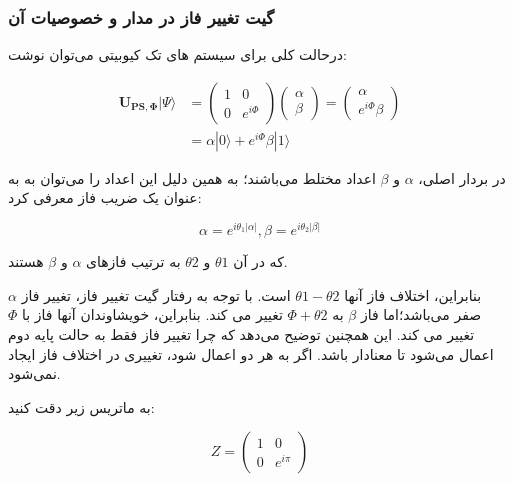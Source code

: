 \documentclass{book}
\begin{document}
\subsubsection{گیت تغییر فاز در مدار و خصوصیات آن}
درحالت کلی برای سیستم های تک کیوبیتی می‌توان نوشت:

\begin{center}
	$$\begin{aligned}
		\boldsymbol{U}_{\boldsymbol{P S}, \boldsymbol{\Phi}}|\Psi\rangle & =\left(\begin{array}{cc}
			1 & 0 \\
			0 & e^{i \Phi}
		\end{array}\right)\left(\begin{array}{l}
			\alpha \\
			\beta
		\end{array}\right)=\left(\begin{array}{c}
			\alpha \\
			e^{i \Phi} \beta
		\end{array}\right) \\
		& =\alpha|0\rangle+e^{i \Phi} \beta|1\rangle
	\end{aligned}$$
\end{center}
در بردار اصلی، $\alpha$ و $\beta$ اعداد مختلط می‌باشند؛ به همین دلیل این اعداد را می‌توان به به عنوان یک ضریب فاز معرفی کرد:

\begin{center}
\begin{equation}
\alpha = e^{i\theta_{1} \vert\alpha\vert }, \beta = e^{i\theta_{2} \vert\beta\vert}
\end{equation}
\end{center}
که در آن $\theta1$ و $\theta2$ به ترتیب فازهای $\alpha$ و $\beta$ هستند.

بنابراین، اختلاف فاز آنها $θ1 - θ2$ است. با توجه به رفتار گیت تغییر فاز، تغییر فاز $\alpha$ صفر می‌باشد؛‌اما فاز $β$ به $ Φ + θ2 $ تغییر می کند. بنابراین، خویشاوندان آنها فاز با $Φ$ تغییر می کند. این همچنین توضیح می‌دهد که چرا تغییر فاز فقط به حالت پایه دوم اعمال می‌شود تا معنادار باشد. اگر به هر دو اعمال شود، تغییری در اختلاف فاز ایجاد نمی‌شود.

به ماتریس زیر دقت کنید:

\begin{equation}
	\label{eq:z-gate}
	Z = \left(
	\begin{array}{cc}
		1 & 0 \\
		0 & e^{i\pi}
	\end{array}
	\right)
\end{equation} 			
\pagebreak
\end{document}
